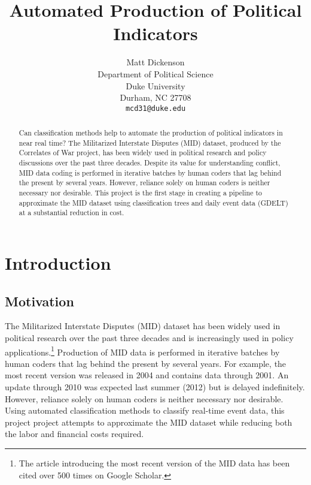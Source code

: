 \documentclass[12pt,letterpaper]{article} %
\title{Automated Production of Political Indicators}
\author{
Matt Dickenson\\
Department of Political Science\\
Duke University\\
Durham, NC 27708 \\
\texttt{mcd31@duke.edu}
}
\begin{document}
\begin{titlepage}

\clearpage
\maketitle
\thispagestyle{empty}

\begin{abstract}
Can classification methods help to automate the production of political indicators in near real time? The Militarized Interstate Disputes (MID) dataset, produced by the Correlates of War project, has been widely used in political research and policy discussions over the past three decades. Despite its value for understanding conflict, MID data coding is performed in iterative batches by human coders that lag behind the present by several years. However, reliance solely on human coders is neither necessary nor desirable. This project is the first stage in creating a pipeline to approximate the MID dataset using classification trees and daily event data (GDELT) at a substantial reduction in cost. 
\end{abstract}

\end{titlepage}



\newpage

\section{Introduction}

\subsection{Motivation}

The Militarized Interstate Disputes (MID) dataset has been widely used in political research over the past three decades and is increasingly used in policy applications.\footnote{The article introducing the most recent version of the MID data has been cited over 500 times on Google Scholar.} Production of MID data is performed in iterative batches by human coders that lag behind the present by several years. For example, the most recent version was released in 2004 and contains data through 2001. An update through 2010 was expected last summer (2012) but is delayed indefinitely. However, reliance solely on human coders is neither necessary nor desirable. Using automated classification methods to classify real-time event data, this project project attempts to approximate the MID dataset while reducing both the labor and financial costs required.
\end{document}
